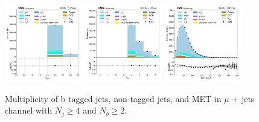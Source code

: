 \begin{figure}[htb!]
    \centering
    \includegraphics[width=0.3\textwidth]{chapters/Appendix/sectionPlots/figures/data_mc_overlays/mujet_2016_cat_gt4_gt2_signal_linear_jet_n_bjets}
    \includegraphics[width=0.3\textwidth]{chapters/Appendix/sectionPlots/figures/data_mc_overlays/mujet_2016_cat_gt4_gt2_signal_linear_jet_n_jets}
    \includegraphics[width=0.3\textwidth]{chapters/Appendix/sectionPlots/figures/data_mc_overlays/mujet_2016_cat_gt4_gt2_signal_linear_misc_met_mag}
    \caption{Multiplicity of b tagged jets, non-tagged jets, and MET in
    $\mu$ + jets channel with $N_{j} \geq 4$ and $N_{b} \geq 2$.
    \label{fig:mujet_2_jetmet}}
\end{figure}
